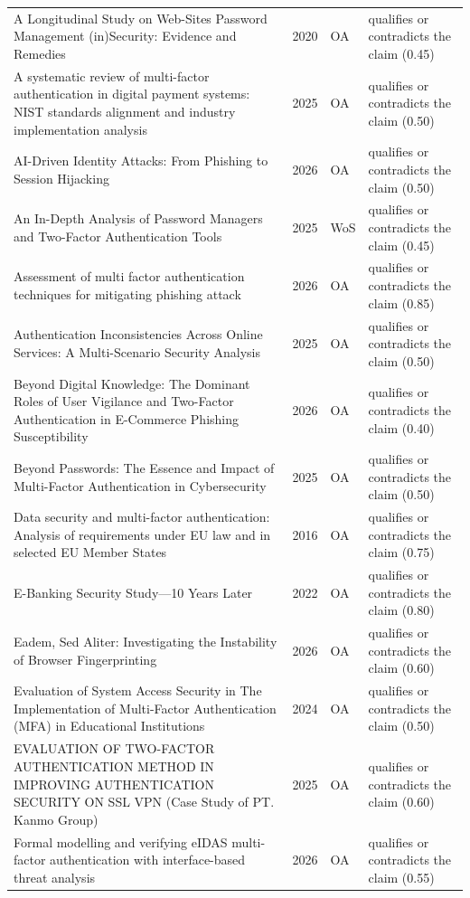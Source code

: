 \begin{longtable}{@{}%
  >{\raggedright\arraybackslash}p{}c%
  >{\raggedright\arraybackslash}p{}%
  >{\raggedright\arraybackslash}p{}@{}}
A Longitudinal Study on Web-Sites Password Management (in)Security: Evidence and Remedies & 2020 & OA & qualifies or contradicts the claim (0.45) \\
A systematic review of multi-factor authentication in digital payment systems: NIST standards alignment and industry implementation analysis & 2025 & OA & qualifies or contradicts the claim (0.50) \\
AI-Driven Identity Attacks: From Phishing to Session Hijacking & 2026 & OA & qualifies or contradicts the claim (0.50) \\
An In-Depth Analysis of Password Managers and Two-Factor Authentication Tools & 2025 & WoS & qualifies or contradicts the claim (0.45) \\
Assessment of multi factor authentication techniques for mitigating phishing attack & 2026 & OA & qualifies or contradicts the claim (0.85) \\
Authentication Inconsistencies Across Online Services: A Multi-Scenario Security Analysis & 2025 & OA & qualifies or contradicts the claim (0.50) \\
Beyond Digital Knowledge: The Dominant Roles of User Vigilance and Two-Factor Authentication in E-Commerce Phishing Susceptibility & 2026 & OA & qualifies or contradicts the claim (0.40) \\
Beyond Passwords: The Essence and Impact of Multi-Factor Authentication in Cybersecurity & 2025 & OA & qualifies or contradicts the claim (0.50) \\
Data security and multi-factor authentication: Analysis of requirements under EU law and in selected EU Member States & 2016 & OA & qualifies or contradicts the claim (0.75) \\
E-Banking Security Study---10 Years Later & 2022 & OA & qualifies or contradicts the claim (0.80) \\
Eadem, Sed Aliter: Investigating the Instability of Browser Fingerprinting & 2026 & OA & qualifies or contradicts the claim (0.60) \\
Evaluation of System Access Security in The Implementation of Multi-Factor Authentication (MFA) in Educational Institutions & 2024 & OA & qualifies or contradicts the claim (0.50) \\
EVALUATION OF TWO-FACTOR AUTHENTICATION METHOD IN IMPROVING AUTHENTICATION SECURITY ON SSL VPN (Case Study of PT. Kanmo Group) & 2025 & OA & qualifies or contradicts the claim (0.60) \\
Formal modelling and verifying eIDAS multi-factor authentication with interface-based threat analysis & 2026 & OA & qualifies or contradicts the claim (0.55) \\

\end{longtable}
